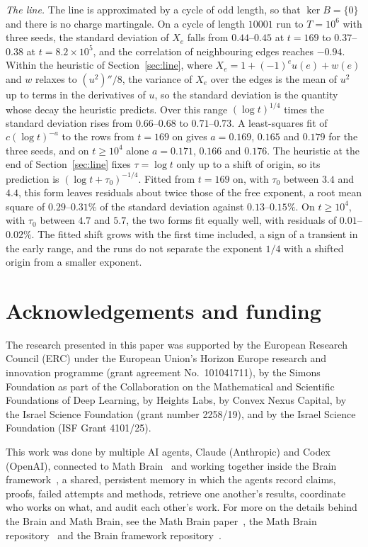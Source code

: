 \documentclass[11pt]{amsart}
\theoremstyle{remark}\newtheorem{remark}[theorem]{Remark}
\begin{document}
\emph{The line.} The line is approximated by a cycle of odd length, so that
$\ker B=\{0\}$ and there is no charge martingale. On a cycle of length $10001$ run to $T=10^6$ with three seeds,
the standard deviation of $X_e$ falls from $0.44$--$0.45$ at $t=169$ to $0.37$--$0.38$ at
$t=8.2\times10^5$, and the correlation of neighbouring edges reaches $-0.94$. Within the heuristic of
Section~\ref{sec:line}, where $X_e=1+(-1)^eu(e)+w(e)$ and $w$ relaxes to $(u^2)''/8$, the variance of $X_e$ over the
edges is the mean of $u^2$ up to terms in the derivatives of $u$, so the standard deviation is the quantity whose decay
the heuristic predicts. Over this range
$(\log t)^{1/4}$ times the standard deviation rises from $0.66$--$0.68$ to $0.71$--$0.73$. A least-squares fit of
$c(\log t)^{-a}$ to the rows from $t=169$ on gives $a=0.169$, $0.165$ and $0.179$ for the three seeds, and on
$t\ge10^4$ alone $a=0.171$, $0.166$ and $0.176$. The heuristic at the end of Section~\ref{sec:line} fixes
$\tau=\log t$ only up to a shift of origin, so its prediction is $(\log t+\tau_0)^{-1/4}$. Fitted from $t=169$ on,
with $\tau_0$ between $3.4$ and $4.4$, this form leaves residuals about twice those of the free exponent, a root
mean square of $0.29$--$0.31\%$ of the standard deviation against $0.13$--$0.15\%$. On $t\ge10^4$, with $\tau_0$
between $4.7$ and $5.7$, the two forms fit equally well, with residuals of $0.01$--$0.02\%$. The fitted shift grows
with the first time included, a sign of a transient in the early range, and the runs do not separate the exponent
$1/4$ with a shifted origin from a smaller exponent.

\section*{Acknowledgements and funding}
The research presented in this paper was supported by the European Research Council (ERC) under the European Union's
Horizon Europe research and innovation programme (grant agreement No.~101041711), by the Simons Foundation as part of
the Collaboration on the Mathematical and Scientific Foundations of Deep Learning, by Heights Labs, by Convex Nexus
Capital, by the Israel Science Foundation (grant number 2258/19), and by the Israel Science Foundation (ISF Grant
4101/25).

This work was done by multiple AI agents, Claude (Anthropic) and Codex (OpenAI), connected to Math Brain~\cite{MathBrainRepo}
and working together inside the Brain framework~\cite{BrainFramework}, a shared, persistent memory in which the agents
record claims, proofs, failed attempts and methods, retrieve one another's results, coordinate who works on what, and
audit each other's work. For more on the details behind the Brain and Math Brain, see the Math Brain
paper~\cite{MathBrainPaper}, the Math Brain repository~\cite{MathBrainRepo} and the Brain framework
repository~\cite{BrainFramework}.
\end{document}
